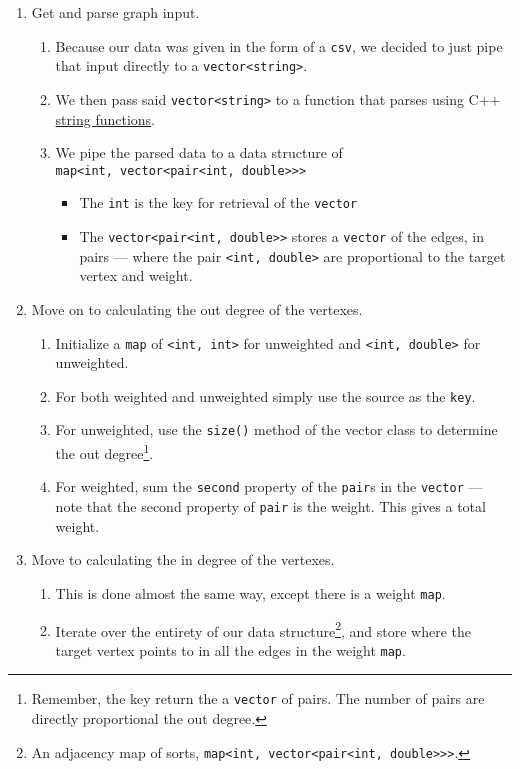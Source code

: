 \documentclass{article}
\newcommand{\shellcmd}[1]{\texttt{\colorbox{gray!30}{#1}}}
\begin{document}
\begin{enumerate}
    \item Get and parse graph input.
    \begin{enumerate}
        \item Because our data was given in the form of a \texttt{csv}, we decided to just pipe that input directly to a \shellcmd{vector<string>}.
        \item We then pass said \shellcmd{vector<string>} to a function that parses using C++ \href{http://www.cplusplus.com/reference/string/string/}{string functions}.
        \item We pipe the parsed data to a data structure of \\ \shellcmd{map<int, vector<pair<int, double>>>}
        \begin{itemize}
            \item The \texttt{int} is the key for retrieval of the \shellcmd{vector}
            \item The \shellcmd{vector<pair<int, double>>} stores a \texttt{vector} of the edges, in pairs --- where the pair \shellcmd{<int, double>} are proportional to the target vertex and weight.
        \end{itemize}
    \end{enumerate}

    \item Move on to calculating the out degree of the vertexes.
    \begin{enumerate}
        \item Initialize a \shellcmd{map} of \shellcmd{<int, int>} for unweighted and \shellcmd{<int, double>} for unweighted.
        \item For both weighted and unweighted simply use the source as the \texttt{key}.
        \item For unweighted, use the \shellcmd{size()} method of the vector class to determine the out degree\footnote{Remember, the key return the a \shellcmd{vector} of pairs. The number of pairs are directly proportional the out degree.}.
        \item For weighted, sum the \shellcmd{second} property of the \shellcmd{pair}s in the \shellcmd{vector} --- note that the second property of \shellcmd{pair} is the weight. This gives a total weight.
     \end{enumerate}

    \item Move to calculating the in degree of the vertexes.
    \begin{enumerate}
        \item This is done almost the same way, except there is a weight \shellcmd{map}.
        \item Iterate over the entirety of our data structure\footnote{An adjacency map of sorts, \shellcmd{map<int, vector<pair<int, double>>>}.}, and store where the target vertex points to in all the edges in the weight \shellcmd{map}.
    \end{enumerate}


\end{enumerate}
\end{document}
